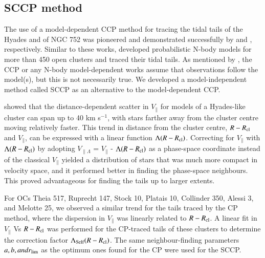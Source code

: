 \documentclass{aa}
\begin{document}
\subsection{SCCP method}\label{sec: SCCP}

The use of a model-dependent CCP method for tracing the tidal tails of the Hyades and of NGC 752 was pioneered and demonstrated successfully by \citet{2021A&A...647A.137Jerabkova} and \citet{2022MNRAS.514.3579Boffin}, respectively. Similar to these works, \citet{2024arXiv240618767Kos} developed probabilistic N-body models for more than 450 open clusters and traced their tidal tails. As mentioned by \citet{2022MNRAS.514.3579Boffin}, the CCP or any N-body model-dependent works assume that observations follow the model(s), but this is not necessarily true. We developed a model-independent method called SCCP as an alternative to the model-dependent CCP.

\citet{2021A&A...647A.137Jerabkova} showed that the distance-dependent scatter in $V_{\parallel}$ for models of a Hyades-like cluster can span up to 40 km s$^{-1}$, with stars farther away from the cluster centre moving relatively faster. This trend in distance from the cluster centre, $R - R\textsubscript{cl}$ and $V_{\parallel}$, can be expressed with a linear function $\Lambda(R - R\textsubscript{cl})$. Correcting for $V_{\parallel}$ with $\Lambda(R - R\textsubscript{cl})$ by adopting $V_{\parallel \Lambda}$ = $V_{\parallel}$ - $\Lambda(R - R\textsubscript{cl})$ as a phase-space coordinate instead of the classical $V_{\parallel}$ yielded a distribution of stars that was much more compact in velocity space, and it performed better in finding the phase-space neighbours. This proved advantageous for finding the tails up to larger extents. 

For OCs Theia 517, Ruprecht 147, Stock 10, Platais 10, Collinder 350, Alessi 3, and Melotte 25, we observed a similar trend for the tails traced by the CP method, where the dispersion in $V_{\parallel}$ was linearly related to $R- R\textsubscript{cl}$. A linear fit in $V_{\parallel}$ Vs $R- R\textsubscript{cl}$ was performed for the CP-traced tails of these clusters to determine the correction factor $\Lambda\textsubscript{Self}(R - R\textsubscript{cl})$. The same neighbour-finding parameters $a, b, and r_{\rm{lim}}$ as the optimum ones found for the CP were used for the SCCP.    
\end{document}
